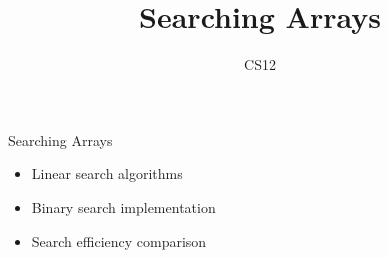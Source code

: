 \documentclass{beamer}
\title{Searching Arrays}
\author{CS12}
\date{}
\begin{document}
\begin{frame}
    \titlepage
\end{frame}

\begin{frame}{Searching Arrays}
    \begin{itemize}
        \item Linear search algorithms
        \item Binary search implementation
        \item Search efficiency comparison
    \end{itemize}
\end{frame}
\end{document}
